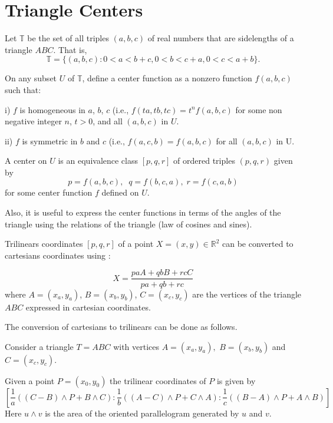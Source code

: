 \section{Triangle Centers}
\label{app:Atri-ctrs}

Let $\mathbb{T}$ be the set of all triples $(a, b, c)$ of real numbers that are sidelengths of a triangle $ABC$. That is,
\[
\mathbb{T} = \{ (a, b, c): 0 <a< b + c, 0 <b < c +a, 0 < c < a+ b\}.\]

On any subset $U$ of $\mathbb{T}$, define a center  function as a nonzero function $f(a, b, c)$ such that:

\noindent i) $f$ is homogeneous in $a$, $b$, $c$ (i.e., $f(ta, tb, tc) = t^n f(a, b, c)$   for some non negative integer
$n$,  $t > 0$, and all $(a, b, c) $ in $U$.

\noindent ii) $f$ is  symmetric in $b$ and $c$ (i.e., $f(a, c, b)= f(a, b, c)$
for all $(a, b, c)$ in U. 


A center on $U$ is an equivalence class $[p,q,r]$ of ordered triples
$(p,q,r) $ given by
 \[p= f( a, b, c),\;\; q= f( b, c, a),\; r = f( c, a, b)\]
for some center function $f$ defined on $U$. 

\begin{remark}
 Also, it is useful to express the center functions in terms of the angles of the triangle using the relations of the triangle (law of cosines and sines).
\end{remark}
 
Trilinears coordinates $[p,q,r]$  of a point $X=(x,y) \in \mathbb{R}^2$ can be  converted to cartesians coordinates using \cite{mw}:

\begin{equation}
\label{eqn:appAtrilin-cartesian}
X=\frac{p a A + q b B + r c C}{pa+q b+r c}
\end{equation}
where $A=(x_a,y_a)$, $B=(x_b,y_b)$, $C=(x_c,y_c)$ are the vertices of the triangle $ABC$ expressed in cartesian coordinates.

The conversion of cartesians  to trilinears can be done as follows.

Consider a triangle $T=ABC$ with vertices $A=(x_a,y_a),$ $B=(x_b,y_b)$ and $C=(x_c,y_c)$.

Given a point $P=(x_0,y_0)$ the trilinear coordinates of $P$
is given by
{\small 
\[ \left[ \frac{1}{a}( (C-B)\wedge P+B\wedge C): \frac{1}{b}( (A-C)\wedge P+C\wedge A): \frac{1}{c}( (B-A)\wedge P+A\wedge B)\right] \]}
Here $u\wedge v$ is the area of the oriented parallelogram generated by $u$ and $v$.

